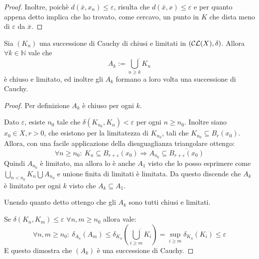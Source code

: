 \begin{proof}
	Inoltre, poichè $d(\bar x,x_n)\le \varepsilon$, risulta che $d(\bar x, x)\le \varepsilon$ e per quanto appena detto implica che ho trovato, come cercavo, un punto in $K$ che dista meno di $\varepsilon$ da $\bar x$.
	
\end{proof}

\begin{lemma} \label{UnioniDiCauchy}
Sia $(K_n)$ una successione di Cauchy di chiusi e limitati in $\left (\mathcal{CL}(X),\delta\right  ) $. 
Allora $\forall k \in \mathbb{N}$ vale che
\begin{equation*}
A_k:=\overline{\bigcup_{n\geq k} K_n}
\end{equation*}
è chiuso e limitato, ed inoltre gli $A_k$ formano a loro volta una successione di Cauchy.
\end{lemma}

\begin{proof}
Per definizione $A_k$ è chiuso per ogni $k$. 

Dato $\varepsilon$, esiste $n_0$ tale che $\delta(K_{n_0}, K_n)< \varepsilon$ per ogni $n\geq n_0$. 
Inoltre siano $x_0\in X,r>0$, che esistono per la limitatezza di $K_{n_0}$, tali che $K_{n_0}\subseteq B_r(x_0)$. 
Allora, con una facile applicazione della disuguaglianza triangolare ottengo:
\begin{equation*}
	\forall n\ge n_0:\ K_n\subseteq B_{r+\varepsilon}(x_0) \Rightarrow A_{n_0}\subseteq \overline{B_{r+\varepsilon}(x_0)}
\end{equation*}
Quindi $A_{n_0}$ è limitato, ma allora lo è anche $A_1$ visto che lo posso esprimere come $\bigcup_{n<n_0}K_n \bigcup A_{n_0}$ e unione finita di limitati è limitata. Da questo discende che $A_k$ è limitato per ogni $k$ visto che $A_k\subseteq A_1$.

Unendo quanto detto ottengo che gli $A_k$ sono tutti chiusi e limitati.

Se $\delta(K_n, K_m)\leq \varepsilon$ $\forall n,m \geq n_0$  allora vale:
\begin{equation*}
	\forall n,m\ge n_0:\ \delta_{A_n}(A_m)\le \delta_{K_n}\left(\overline{\bigcup_{i\ge m}K_i} \right)
	=\sup_{i\ge m} \delta_{K_n}(K_i) \le \varepsilon
\end{equation*}
E questo dimostra che $(A_k)$ è una successione di Cauchy.
\end{proof}

